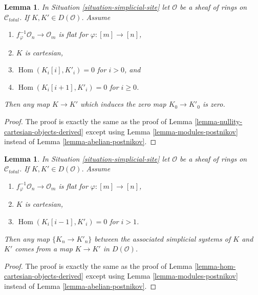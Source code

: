 \documentclass{stacks-project}
\theoremstyle{plain}
\newtheorem{lemma}[subsection]{Lemma}
\theoremstyle{definition}
\theoremstyle{remark}
\numberwithin{equation}{subsection}
\def\Hom{\mathop{\mathrm{Hom}}\nolimits}
\begin{document}
\begin{lemma}
\label{lemma-nullity-cartesian-modules-derived}
In Situation \ref{situation-simplicial-site} let $\mathcal{O}$ be
a sheaf of rings on $\mathcal{C}_{total}$.
If $K, K' \in D(\mathcal{O})$.
Assume
\begin{enumerate}
\item $f_\varphi^{-1}\mathcal{O}_n \to \mathcal{O}_m$ is flat for
$\varphi : [m] \to [n]$,
\item $K$ is cartesian,
\item $\Hom(K_i[i], K'_i) = 0$ for $i > 0$, and
\item $\Hom(K_i[i + 1], K'_i) = 0$ for $i \geq 0$.
\end{enumerate}
Then any map $K \to K'$ which induces the zero map $K_0 \to K'_0$ is zero.
\end{lemma}

\begin{proof}
The proof is exactly the same as the proof of
Lemma \ref{lemma-nullity-cartesian-objects-derived} except using
Lemma \ref{lemma-modules-postnikov} instead of
Lemma \ref{lemma-abelian-postnikov}.
\end{proof}

\begin{lemma}
\label{lemma-hom-cartesian-modules-derived}
In Situation \ref{situation-simplicial-site} let $\mathcal{O}$ be
a sheaf of rings on $\mathcal{C}_{total}$.
If $K, K' \in D(\mathcal{O})$.
Assume
\begin{enumerate}
\item $f_\varphi^{-1}\mathcal{O}_n \to \mathcal{O}_m$ is flat for
$\varphi : [m] \to [n]$,
\item $K$ is cartesian,
\item $\Hom(K_i[i - 1], K'_i) = 0$ for $i > 1$.
\end{enumerate}
Then any map $\{K_n \to K'_n\}$ between the associated simplicial systems 
of $K$ and $K'$ comes from a map $K \to K'$ in $D(\mathcal{O})$.
\end{lemma}

\begin{proof}
The proof is exactly the same as the proof of
Lemma \ref{lemma-hom-cartesian-objects-derived} except using
Lemma \ref{lemma-modules-postnikov} instead of
Lemma \ref{lemma-abelian-postnikov}.
\end{proof}
\end{document}
